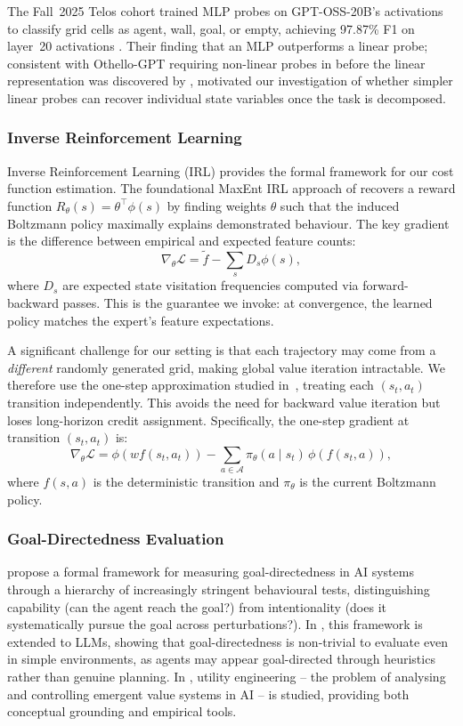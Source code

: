 \documentclass[final]{sparreport}
\begin{document}
The Fall~2025 Telos cohort trained MLP
probes on GPT-OSS-20B's activations to classify grid cells as agent, wall, goal, or empty, achieving 97.87\% F1 on layer~20 activations \cite{arghal2026behavioural}.
Their finding that an MLP outperforms a linear probe; consistent with
Othello-GPT requiring non-linear probes in \cite{li2023emergent} before the linear representation was discovered by \cite{nanda-etal-2023-emergent}, motivated our investigation of whether simpler linear probes can recover individual state variables once the task is decomposed.

\subsubsection{Inverse Reinforcement Learning}
Inverse Reinforcement Learning (IRL) provides the formal framework for our cost function estimation. The foundational MaxEnt IRL approach of \cite{ziebartMaximumEntropyInverse2008a}
recovers a reward function $R_\theta(s) = \theta^\top \phi(s)$ by
finding weights $\theta$ such that the induced Boltzmann policy maximally
explains demonstrated behaviour. The key gradient is the difference between empirical and expected feature
counts:
\[
  \nabla_\theta \mathcal{L}
  = \tilde{f} - \sum_{s} D_{s} \phi(s),
\]
where $D_s$ are expected state visitation frequencies computed via forward-backward passes. This is the guarantee we invoke: at convergence, the learned policy matches the expert's feature expectations.
 
A significant challenge for our setting is that each trajectory may come
from a \emph{different} randomly generated grid, making global value iteration intractable. We therefore use the one-step approximation studied in~\cite{arghal2026behavioural}, treating each $(s_t, a_t)$ transition independently.
This avoids the need for backward value iteration but loses long-horizon credit assignment. Specifically, the one-step gradient at transition $(s_t, a_t)$ is:
\[
  \nabla_\theta \mathcal{L}
  = \phi(wf(s_t, a_t))
  - \sum_{a \in \mathcal{A}} \pi_\theta(a \mid s_t) \, \phi(f(s_t, a)),
\]
where $f(s,a)$ is the deterministic transition and $\pi_\theta$ is the
current Boltzmann policy.

\subsubsection{Goal-Directedness Evaluation}
\cite{macdermott2024-measuring} propose a formal framework for measuring goal-directedness in AI systems through a hierarchy of increasingly stringent behavioural tests, distinguishing capability (can the agent reach the goal?) from intentionality (does it systematically pursue the goal across perturbations?).
In \cite{everitt2025evaluating}, this framework is extended to LLMs, showing that goal-directedness is non-trivial to evaluate even in simple environments, as agents may appear goal-directed through heuristics rather than genuine planning.
In \cite{mazeika_utility_2025}, utility engineering -- the problem of analysing and controlling emergent value systems in AI -- is studied, providing both conceptual grounding and empirical tools.
\end{document}
